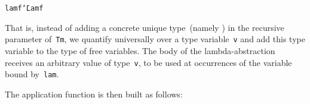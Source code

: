 \documentclass[9pt,preprint,authoryear]{sigplanconf}
\begin{document}
{{{}\vphantom{$\{$}}}\textcolor[rgb]{0,0,0.80}{\texttt{lam}}\textcolor[rgb]{0,0,0.80}{\texttt{\mbox{\hspace{0.50em}}}}\textcolor[rgb]{0,0,0.80}{\texttt{f}}\textcolor[rgb]{0,0,0.80}{\texttt{\mbox{\hspace{0.50em}}}}\textcolor[cmyk]{0,0.65,0.99,0}{\texttt{{\char `\=}}}\textcolor[rgb]{0,0,0.80}{\texttt{\mbox{\hspace{0.50em}}}}\textcolor[rgb]{0.70,0.13,0.13}{\texttt{Lam}}\textcolor[rgb]{0,0,0.80}{\texttt{\mbox{\hspace{0.50em}}}}\textcolor[cmyk]{0,0.65,0.99,0}{\texttt{\makebox[1.22ex][l]{$ {(} $}}}\textcolor[rgb]{0,0,0.80}{\texttt{f}}\textcolor[rgb]{0,0,0.80}{\texttt{\mbox{\hspace{0.50em}}}}\textcolor[cmyk]{0,0.65,0.99,0}{\texttt{\makebox[1.22ex][l]{$ {(} $}}}\textcolor[cmyk]{0,0.65,0.99,0}{\texttt{\makebox[1.22ex][r]{$ {)} $}}}\textcolor[cmyk]{0,0.65,0.99,0}{\texttt{\makebox[1.22ex][r]{$ {)} $}}}\textcolor[rgb]{0,0,0.80}{\texttt{{\nopagebreak \newline%
}\vphantom{$\{$}}}%


%
That is, instead of adding a concrete unique type{~}(namely \textcolor[cmyk]{0,0.65,0.99,0}{\texttt{\makebox[1.22ex][l]{$ {(} $}}}\textcolor[cmyk]{0,0.65,0.99,0}{\texttt{\makebox[1.22ex][r]{$ {)} $}}}) in
    the recursive parameter of{~}\textcolor[rgb]{0,0,0.80}{\texttt{Tm}}, we quantify universally over a
    type variable{~}\textcolor[rgb]{0,0,0.80}{\texttt{v}} and add this type variable to the type of free
    variables. The body of the lambda-abstraction receives an arbitrary value of type{~}\textcolor[rgb]{0,0,0.80}{\texttt{v}},
    to be used at occurrences of the variable bound by{~}\textcolor[rgb]{0,0,0.80}{\texttt{lam}}.%


%
The application function is then built as follows{:}%


{\nopagebreak }
\end{document}
